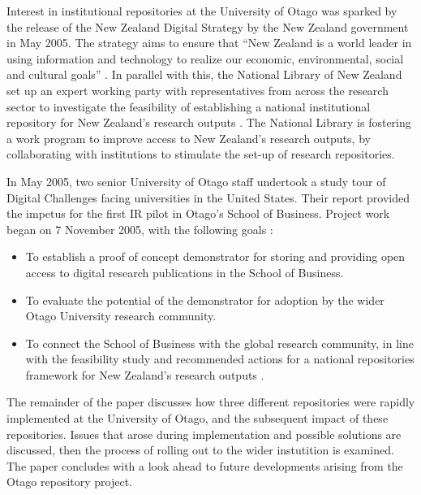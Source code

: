 \documentclass[12pt,pdftex,a4paper,titlepage]{article}
\begin{document}
Interest in institutional repositories at the University of Otago was sparked by the release of the New Zealand Digital Strategy by the New Zealand government in May 2005. The strategy aims to ensure that ``New Zealand is a world leader in using information and technology to realize our economic, environmental, social and cultural goals'' \cite{NZG-2005-digital_strategy}. In parallel with this, the National Library of New Zealand set up an expert working party with representatives from across the research sector to investigate the feasibility of establishing a national institutional repository for New Zealand's research outputs \cite{Rank-J-2005-feasibility}. The National Library is fostering a work program to improve access to New Zealand's research outputs, by collaborating with institutions to stimulate the set-up of research repositories.

In May 2005, two senior University of Otago staff undertook a study tour of Digital Challenges facing universities in the United States. Their report provided the impetus for the first IR pilot in Otago's School of Business. Project work began on 7 November 2005, with the following goals \cite{Stan-N-2006-running}:
\begin{itemize}

	\item To establish a proof of concept demonstrator for storing and providing open access to digital research publications in the School of Business.

	\item To evaluate the potential of the demonstrator for adoption by the wider Otago University research community.

	\item To connect the School of Business with the global research community, in line with the feasibility study and recommended actions for a national repositories framework for New Zealand's research outputs \cite{Rank-J-2005-feasibility}.

\end{itemize}

The remainder of the paper discusses how three different repositories were rapidly implemented at the University of Otago, and the subsequent impact of these repositories. Issues that arose during implementation and possible solutions are discussed, then the process of rolling out to the wider instutition is examined. The paper concludes with a look ahead to future developments arising from the Otago repository project.
\end{document}
